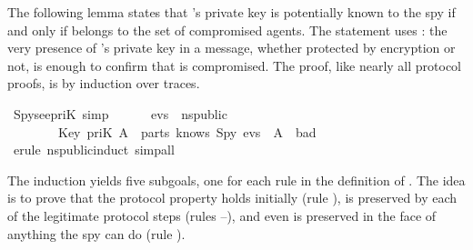 \begin{isabellebody}
\begin{isamarkuptext}
The following lemma states that 's private key is potentially
known to the spy if and only if  belongs to the set  of
compromised agents.  The statement uses : the very presence of
's private key in a message, whether protected by encryption or
not, is enough to confirm that  is compromised.  The proof, like
nearly all protocol proofs, is by induction over traces.%
\end{isamarkuptext}%
\isamarkuptrue%
\isamarkupfalse%
\ Spy{\isacharunderscore}see{\isacharunderscore}priK\ {\isacharbrackleft}simp{\isacharbrackright}{\isacharcolon}\isanewline
\ \ \ \ \ \ {\isachardoublequoteopen}evs\ {\isasymin}\ ns{\isacharunderscore}public\isanewline
\ \ \ \ \ \ \ {\isasymLongrightarrow}\ {\isacharparenleft}Key\ {\isacharparenleft}priK\ A{\isacharparenright}\ {\isasymin}\ parts\ {\isacharparenleft}knows\ Spy\ evs{\isacharparenright}{\isacharparenright}\ {\isacharequal}\ {\isacharparenleft}A\ {\isasymin}\ bad{\isacharparenright}{\isachardoublequoteclose}\isanewline
%
\isadelimproof
%
\endisadelimproof
%
\isatagproof
{}\isamarkupfalse%
\ {\isacharparenleft}erule\ ns{\isacharunderscore}public{\isachardot}induct{\isacharcomma}\ simp{\isacharunderscore}all{\isacharparenright}%
\begin{isamarkuptxt}%
The induction yields five subgoals, one for each rule in the definition of
.  The idea is to prove that the protocol property holds initially
(rule ), is preserved by each of the legitimate protocol steps (rules
--), and even is preserved in the face of anything the
spy can do (rule ).  


\end{isamarkuptxt}
\end{isabellebody}
